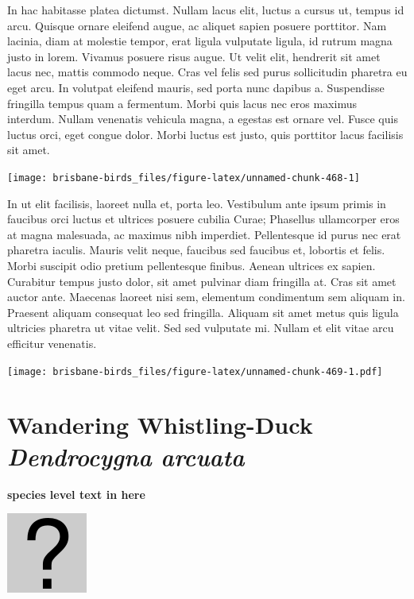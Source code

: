 \documentclass[]{book}
\let\origfigure\figure
\let\endorigfigure\endfigure
\renewenvironment{figure}[1][2] {
  \expandafter\origfigure\expandafter[H]
} {
  \endorigfigure
}
\begin{document}
In hac habitasse platea dictumst. Nullam lacus elit, luctus a cursus ut,
tempus id arcu. Quisque ornare eleifend augue, ac aliquet sapien posuere
porttitor. Nam lacinia, diam at molestie tempor, erat ligula vulputate
ligula, id rutrum magna justo in lorem. Vivamus posuere risus augue. Ut
velit elit, hendrerit sit amet lacus nec, mattis commodo neque. Cras vel
felis sed purus sollicitudin pharetra eu eget arcu. In volutpat eleifend
mauris, sed porta nunc dapibus a. Suspendisse fringilla tempus quam a
fermentum. Morbi quis lacus nec eros maximus interdum. Nullam venenatis
vehicula magna, a egestas est ornare vel. Fusce quis luctus orci, eget
congue dolor. Morbi luctus est justo, quis porttitor lacus facilisis sit
amet.

\begin{figure}
\texttt{[image: brisbane-birds\_files/figure-latex/unnamed-chunk-468-1]} \caption{insert figure caption}\label{fig:unnamed-chunk-468}
\end{figure}

In ut elit facilisis, laoreet nulla et, porta leo. Vestibulum ante ipsum
primis in faucibus orci luctus et ultrices posuere cubilia Curae;
Phasellus ullamcorper eros at magna malesuada, ac maximus nibh
imperdiet. Pellentesque id purus nec erat pharetra iaculis. Mauris velit
neque, faucibus sed faucibus et, lobortis et felis. Morbi suscipit odio
pretium pellentesque finibus. Aenean ultrices ex sapien. Curabitur
tempus justo dolor, sit amet pulvinar diam fringilla at. Cras sit amet
auctor ante. Maecenas laoreet nisi sem, elementum condimentum sem
aliquam in. Praesent aliquam consequat leo sed fringilla. Aliquam sit
amet metus quis ligula ultricies pharetra ut vitae velit. Sed sed
vulputate mi. Nullam et elit vitae arcu efficitur venenatis.

\begin{figure}
\centering
\texttt{[image: brisbane-birds\_files/figure-latex/unnamed-chunk-469-1.pdf]}
\caption{\label{fig:unnamed-chunk-469}insert figure caption}
\end{figure}

\section{\texorpdfstring{Wandering Whistling-Duck \emph{Dendrocygna
arcuata}}{Wandering Whistling-Duck Dendrocygna arcuata}}\label{wandering-whistling-duck-dendrocygna-arcuata}

\textbf{species level text in here}

\begin{figure}
\centering
\includegraphics{assets/missing.png}
\caption{No image for species}
\end{figure}
\end{document}
